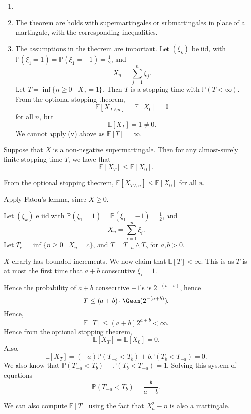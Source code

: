 \documentclass[12pt]{article}
\begin{document}

\begin{remark}
	\begin{enumerate}
		\item[]
		\item The theorem are holds with supermartingales or submartingales in place of a martingale, with the corresponding inequalities.
		\item The assumptions in the theorem are important. Let $(\xi_k)$ be iid, with $\mathbb{P}(\xi_1 = 1) = \mathbb{P}(\xi_1 = -1) = \frac{1}{2}$, and
			\[
			X_n = \sum_{j = 1}^n \xi_j.
			\]
			Let $T = \inf\{n \geq 0 \mid X_n = 1\}$. Then $T$ is a stopping time with $\mathbb{P}(T < \infty)$. From the optional stopping theorem,
			\[
			\mathbb{E}[X_{T \wedge n}] = \mathbb{E}[X_0] = 0
			\]
			for all $n$, but
			\[
			\mathbb{E}[X_T] = 1 \neq 0.
			\]
			We cannot apply (v) above as $\mathbb{E}[T] = \infty$.
	\end{enumerate}
\end{remark}

\begin{proposition}
	Suppose that $X$ is a non-negative supermartingale. Then for any almost-surely finite stopping time $T$, we have that
	\[
	\mathbb{E}[X_T] \leq \mathbb{E}[X_0].
	\]
\end{proposition}

\begin{proofbox}
	From the optional stopping theorem, $\mathbb{E}[X_{T \wedge n}] \leq \mathbb{E}[X_0]$ for all $n$.

	Apply Fatou's lemma, since $X \geq 0$.
\end{proofbox}

\begin{exbox}
	Let $(\xi_k)$ e iid with $\mathbb{P}(\xi_1 = 1) = \mathbb{P}(\xi_1 = -1) = \frac{1}{2}$, and
	\[
	X_n = \sum_{i = 1}^n \xi_i.
	\]
	Let $T_c = \inf\{n \geq 0 \mid X_n = c\}$, and $T = T_{-a} \wedge T_b$ for $a, b > 0$.

	$X$ clearly has bounded increments. We now claim that $\mathbb{E}[T] < \infty$. This is as $T$ is at most the first time that $a + b$ consecutive $\xi_i = 1$.

	Hence the probability of $a+b$ consecutive $+1$'s is $2^{-(a+b)}$, hence
	\[
	T \leq (a + b) \cdot \Geom(2^{-(a+b)}).
	\]
	Hence,
	\[
	\mathbb{E}[T] \leq (a + b) 2^{a + b} < \infty.
	\]
	Hence from the optional stopping theorem,
	\[
	\mathbb{E}[X_T] = \mathbb{E}[X_0] = 0.
	\]
	Also,
	\[
	\mathbb{E}[X_T] = (-a) \mathbb{P}(T_{-a} < T_b) + b \mathbb{P}(T_b < T_{-a}) = 0.
	\]
	We also know that $\mathbb{P}(T_{-a} < T_b) + \mathbb{P}(T_b < T_{-a}) = 1$. Solving this system of equations,
	\[
	\mathbb{P}(T_{-a} < T_b) = \frac{b}{a + b}.
	\]
	
	We can also compute $\mathbb{E}[T]$ using the fact that $X_n^2 - n$ is also a martingale.
\end{exbox}
\end{document}

